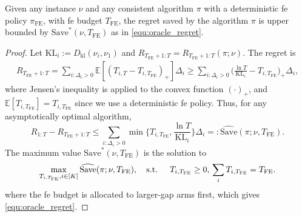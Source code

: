 \documentclass[twoside,11pt]{article}
\newcommand{\kl}{D_{\mathrm{kl}}}
\newcommand{\bbE}{\mathbb{E}}
\newcommand{\Tfe}{T_{\mathrm{FE}}}
\newcommand{\Saved}{\mathrm{Save}}
\newcommand{\FE}{\textrm{FE}}
\begin{document}
\begin{lemma}\label{lem:oracle_regret}
    Given any instance $\nu$ and any consistent algorithm $\pi$ with a deterministic \ac{fe} policy $\pi_{\FE}$, with \ac{fe} budget $\Tfe$, the regret saved by the algorithm $\pi$ is upper bounded by $\Saved^*(\nu,\Tfe)$ as in \eqref{equ:oracle_regret}.
\end{lemma}
\begin{proof}
Let $\mathrm{KL}_i := \kl(\nu_i,\nu_1)$ and $R_{\Tfe+1:T}=R_{\Tfe+1:T}(\pi;\nu)$. The regret is
\begin{align}\label{equ:lwbd}
    R_{\Tfe+1:T}=\sum_{i:\Delta_i>0}\bbE[(T_{i,T}-T_{i,\Tfe})_+]\Delta_i
    \ge\sum_{i:\Delta_i>0}\bigg(\frac{\ln T}{\mathrm{KL}_i}-T_{i,\Tfe}\bigg)_+\Delta_i,
\end{align}
where Jensen's inequality is applied to the convex function $(\cdot)_+$, and $\bbE[T_{i,\Tfe}]=T_{i,\Tfe}$ since we use a deterministic \ac{fe} policy. Thus, for any asymptotically optimal algorithm,
$$R_{1:T}-R_{\Tfe+1:T}\le\sum_{i:\Delta_i>0}\min\bigg\{T_{i,\Tfe},\frac{\ln T}{\mathrm{KL}_i}\bigg\}\Delta_i=:\widehat{\Saved}(\pi;\nu,\Tfe).$$
The maximum value $\Saved^*(\nu,\Tfe)$ is the solution to
$$\max_{T_{i,\Tfe}, i\in[K]}\widehat{\Saved}(\pi;\nu,\Tfe),
\quad\text{s.t. }\quad T_{i,\Tfe}\ge 0,\\ \sum_i T_{i,\Tfe}=\Tfe.$$
where the \ac{fe} budget is allocated to larger-gap arms first, which gives \eqref{equ:oracle_regret}.
\end{proof}
\end{document}
